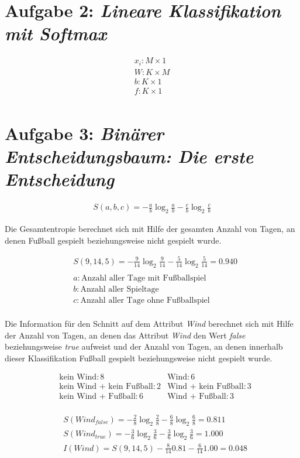 \section*{Aufgabe 2: \emph{Lineare Klassifikation mit Softmax}}
\begin{align*}
&x_i: M \times 1&\\
&W: K \times M& \\
&b: K \times 1& \\
&f: K \times 1& \\
\end{align*}



\section*{Aufgabe 3: \emph{Binärer Entscheidungsbaum: Die erste Entscheidung}}

\begin{align*}
S(a,b,c) = -\frac{a}{b}\log_2{\frac{a}{b}}-\frac{c}{b}\log_2{\frac{c}{b}}
\end{align*}

Die Gesamtentropie berechnet sich mit Hilfe der gesamten Anzahl von Tagen, an denen Fußball gespielt beziehungsweise nicht gespielt wurde.

\begin{align*}
&S(9,14,5) = -\frac{9}{14}\log_2{\frac{9}{14}}-\frac{5}{14}\log_2{\frac{5}{14}}= 0.940\\\\
&a: \text{Anzahl aller Tage mit Fußballspiel}\\
&b: \text{Anzahl aller Spieltage}\\
&c: \text{Anzahl aller Tage ohne Fußballspiel}\\
\end{align*}

Die Information für den Schnitt auf dem Attribut \emph{Wind} berechnet sich mit Hilfe der Anzahl von Tagen, an denen das Attribut \emph{Wind} den Wert \emph{false} beziehungsweise \emph{true} aufweist und der Anzahl von Tagen, an denen innerhalb dieser Klassifikation Fußball gespielt beziehungsweise nicht gespielt wurde.

\begin{align*}
 &\text{kein Wind}: 8    &\text{Wind}:6\\
 &\text{kein Wind + kein Fußball}:2& \text{Wind + kein Fußball}:3\\
&\text{kein Wind + Fußball}:6 & \text{Wind + Fußball}:3\\
\end{align*}

\begin{align*}
&S(Wind_{false}) = -\frac{2}{8}\log_2{\frac{2}{8}}-\frac{6}{8}\log_2{\frac{6}{8}} = 0.811\\
&S(Wind_{true}) = -\frac{3}{6}\log_2{\frac{3}{6}}-\frac{3}{6}\log_2{\frac{3}{6}}= 1.000\\
&I(Wind) = S(9,14,5) - \frac{8}{14}0.81 - \frac{6}{14}1.00 = 0.048
\end{align*}


